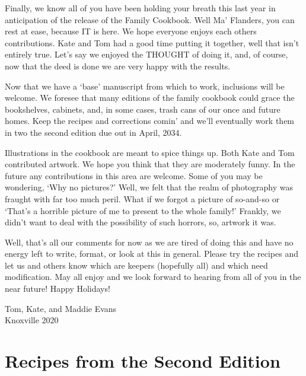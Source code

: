 \documentclass[12pt]{book}
\begin{document}
{\color{red}
Finally, we know all of you have been holding your breath this last year
in anticipation of the release of the Family Cookbook.  Well Ma'
Flanders, you can rest at ease, because IT is here.  We hope everyone
enjoys each others contributions.  Kate and Tom had a good time putting it
together, well that isn't entirely true.  Let's say we enjoyed the
THOUGHT of doing it, and, of course, now that the deed is done we are
very happy with the results.

Now that we have a `base' manuscript from which to work, inclusions will
be welcome.  We foresee that many editions of the family cookbook could
grace the bookshelves, cabinets, and, in some cases, trash cans of our
once and future homes.  Keep the recipes and corrections comin' and we'll
eventually work them in two the second edition due out in April, 2034.

Illustrations in the cookbook are meant to spice things up. Both Kate and
Tom contributed artwork.  We hope you think that they are moderately
funny.  In the future any contributions in this area are welcome.  Some
of you may be wondering, `Why no pictures?'  Well, we felt that the realm
of photography was fraught with far too much peril.  What if we forgot a
picture of so-and-so or `That's a horrible picture of me to present to
the whole family!'  Frankly, we didn't want to deal with the possibility
of such horrors, so, artwork it was.

Well, that's all our comments for now as we are tired of doing this and
have no energy left to write, format, or look at this in general.  Please
try the recipes and let us and others know which are keepers (hopefully
all) and which need modification.  May all enjoy and we look forward to
hearing from all of you  in the near future!  Happy Holidays!
}

\vspace{.5in}
\begin{flushright}
Tom, Kate, and Maddie Evans\\ Knoxville 2020
\end{flushright}


\mainmatter

\part{Recipes from the Second Edition}






\end{document}
